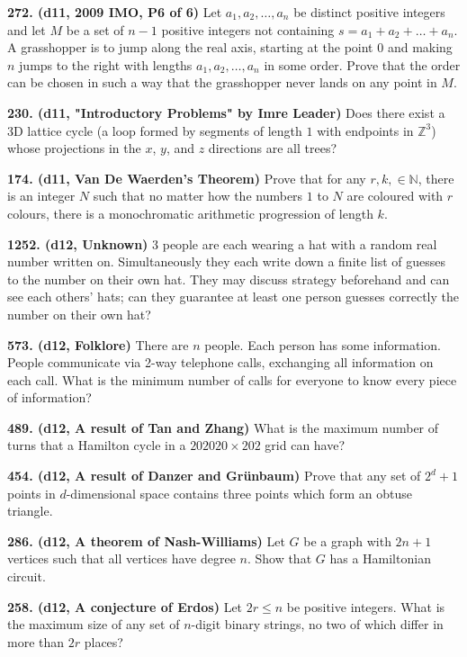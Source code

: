\documentclass{article}
\begin{document}
\textbf{272. (\color{red}d11\color{black}, 2009 IMO, P6 of 6)} Let $ a_1, a_2, \ldots , a_n$ be distinct positive integers and let $ M$ be a set of $ n - 1$ positive integers not containing $ s = a_1 + a_2 + \ldots + a_n.$ A grasshopper is to jump along the real axis, starting at the point $ 0$ and making $ n$ jumps to the right with lengths $ a_1, a_2, \ldots , a_n$ in some order. Prove that the order can be chosen in such a way that the grasshopper never lands on any point in $ M.$

\textbf{230. (\color{red}d11\color{black}, "Introductory Problems" by Imre Leader)} Does there exist a 3D lattice cycle (a loop formed by segments of length $1$ with endpoints in $\mathbb{Z}^3$) whose projections in the $x$, $y$, and $z$ directions are all trees?

\textbf{174. (\color{red}d11\color{black}, Van De Waerden's Theorem)} Prove that for any $r, k , \in \mathbb N$, there is an integer $N$ such that no matter how the numbers $1$ to $N$ are coloured with $r$ colours, there is a monochromatic arithmetic progression of length $k$.

\textbf{1252. (\color{red}d12\color{black}, Unknown)} 3 people are each wearing a hat with a random real number written on. Simultaneously they each write down a finite list of guesses to the number on their own hat. They may discuss strategy beforehand and can see each others' hats; can they guarantee at least one person guesses correctly the number on their own hat?

\textbf{573. (\color{red}d12\color{black}, Folklore)} There are $n$ people. Each person has some information. People communicate via 2-way telephone calls, exchanging all information on each call. What is the minimum number of calls for everyone to know every piece of information?

\textbf{489. (\color{red}d12\color{black}, A result of Tan and Zhang)} What is the maximum number of turns that a Hamilton cycle in a $202020 \times 202$ grid can have?

\textbf{454. (\color{red}d12\color{black}, A result of Danzer and Grünbaum)} Prove that any set of $2^d+1$ points in $d$-dimensional space contains three points which form an obtuse triangle.

\textbf{286. (\color{red}d12\color{black}, A theorem of Nash-Williams)} Let $G$ be a graph with $2n+1$ vertices such that all vertices have degree $n$. Show that $G$ has a Hamiltonian circuit.

\textbf{258. (\color{red}d12\color{black}, A conjecture of Erdos)} Let $2r \leq n$ be positive integers. What is the maximum size of any set of $n$-digit binary strings, no two of which differ in more than $2r$ places?
\end{document}
